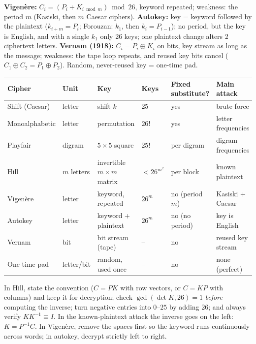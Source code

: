 \begin{mustknow}
\textbf{Vigen\`ere:} $C_i = (P_i + K_{i \bmod m}) \bmod 26$, keyword repeated; weakness: the period $m$ (Kasiski, then $m$ Caesar ciphers).
\textbf{Autokey:} key = keyword followed by the plaintext ($k_{i+m} = P_i$; Forouzan: $k_1$, then $k_i = P_{i-1}$); no period, but the key is English, and with a single $k_1$ only 26 keys; one plaintext change alters 2 ciphertext letters.
\textbf{Vernam (1918):} $C_i = P_i \oplus K_i$ on bits, key stream as long as the message; weakness: the tape loop repeats, and reused key bits cancel ($C_1 \oplus C_2 = P_1 \oplus P_2$). Random, never-reused key = one-time pad.
\end{mustknow}

\begin{center}\small\setlength{\tabcolsep}{4pt}
\begin{tabular}{@{}llllll@{}}
\toprule
Cipher & Unit & Key & Keys & Fixed substitute? & Main attack\\
\midrule
Shift (Caesar) & letter & shift $k$ & 25 & yes & brute force\\
Monoalphabetic & letter & permutation & $26!$ & yes & letter frequencies\\
Playfair & digram & $5\times5$ square & $25!$ & per digram & digram frequencies\\
Hill & $m$ letters & invertible $m\times m$ matrix & $< 26^{m^2}$ & per block & known plaintext\\
Vigen\`ere & letter & keyword, repeated & $26^m$ & no (period $m$) & Kasiski + Caesar\\
Autokey & letter & keyword + plaintext & $26^m$ & no (no period) & key is English\\
Vernam & bit & bit stream (tape) & -- & no & reused key stream\\
One-time pad & letter/bit & random, used once & -- & no & none (perfect)\\
\bottomrule
\end{tabular}
\end{center}

\begin{trap}
In Hill, state the convention ($C = PK$ with row vectors, or $C = KP$ with columns) and keep it for decryption; check $\gcd(\det K, 26) = 1$ \emph{before} computing the inverse; turn negative entries into $0$--$25$ by adding 26; and always verify $KK^{-1} \equiv I$. In the known-plaintext attack the inverse goes on the left: $K = P^{-1}C$. In Vigen\`ere, remove the spaces first so the keyword runs continuously across words; in autokey, decrypt strictly left to right.
\end{trap}

